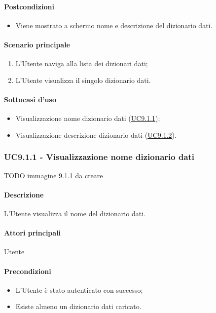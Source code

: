 \paragraph*{Postcondizioni}
\begin{itemize}
  \item Viene mostrato a schermo nome e descrizione del dizionario dati.
\end{itemize}
\paragraph*{Scenario principale}
\begin{enumerate}
  \item L’Utente naviga alla lista dei dizionari dati;
  \item L’Utente visualizza il singolo dizionario dati.
\end{enumerate}
\paragraph*{Sottocasi d'uso}
\begin{itemize}
  \item Visualizzazione nome dizionario dati (\hyperref[UC9point1point1]{UC9.1.1});
  \item Visualizzazione descrizione dizionario dati (\hyperref[UC9point1point2]{UC9.1.2}).
\end{itemize}

\subsubsection{UC9.1.1 - Visualizzazione nome dizionario dati}\label{UC9point1point1}
TODO immagine 9.1.1 da creare
\paragraph*{Descrizione}
L’Utente visualizza il nome del dizionario dati.

\paragraph*{Attori principali} Utente
\paragraph*{Precondizioni}
\begin{itemize}
  \item L’Utente è stato autenticato con successo;
  \item Esiste almeno un dizionario dati caricato.
\end{itemize}
